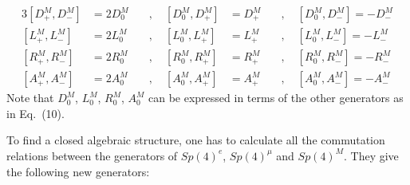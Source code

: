\documentclass[a4paper,12pt]{article}
\begin{document}
\begin{alignat}{3}
[D_{+}^{M},D_{-}^{M}]&=2D_{0}^{M} & \quad, \quad [D_{0}^{M},
D_{+}^{M}]&=D_{+}^{M}
 & \quad, \quad [D_{0}^{M},D_{-}^{M}]=-D_{-}^{M} \\[0.2cm]
[L_{+}^{M},L_{-}^{M}]&=2L_{0}^{M} & \quad, \quad 
[L_{0}^{M},L_{+}^{M}]&=L_{+}^{M}
 & \quad, \quad [L_{0}^{M},L_{-}^{M}]=-L_{-}^{M} \\[0.2cm]
[R_{+}^{M},R_{-}^{M}]&=2R_{0}^{M} & \quad, \quad 
[R_{0}^{M},R_{+}^{M}]&=R_{+}^{M}
 & \quad, \quad [R_{0}^{M},R_{-}^{M}]=-R_{-}^{M} \\[0.2cm]
[A_{+}^{M},A_{-}^{M}]&=2A_{0}^{M} & \quad, \quad 
[A_{0}^{M},A_{+}^{M}]&=A_{+}^{M}
 & \quad, \quad [A_{0}^{M}, A_{-}^{M}]=-A_{-}^{M} 
\end{alignat}
Note that $D_{0}^{M}$, $L_{0}^{M}$, $R_{0}^{M}$, $A_{0}^{M}$ can be  expressed 
in terms of the other generators as in Eq.~(10).

To find a closed algebraic structure, one has to calculate all the 
commutation relations between the generators of  $Sp(4)^e$, $Sp(4)^\mu$ 
and $Sp(4)^M$. They give the following new generators:
\end{document}
